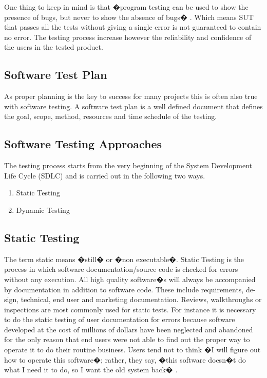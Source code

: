One thing to keep in mind is that �program testing can be used to show the presence of bugs, but never to show the absence of bugs� \cite{Dijkstra1972}. Which means SUT that passes all the tests without giving a single error is not guaranteed to contain no error. The testing process increase however the reliability and confidence of the users in the tested product.

\subsection{Software Test Plan}
As proper planning is the key to success for many projects this is often also true with software testing. A software test plan is a well defined document that defines the goal, scope, method, resources and time schedule of the testing.

\subsection{Software Testing Approaches}
The testing process starts from the very beginning of the System Development Life Cycle (SDLC) and is carried out in the following two ways.

\begin{enumerate}
\item Static Testing 
\item Dynamic Testing
\end{enumerate}

\subsection{Static Testing}

The term static means �still� or �non executable�. Static Testing is the process in which software documentation/source code is checked for errors without any execution. All high quality software�s will always be accompanied by documentation in addition to software code. These include requirements, de- sign, technical, end user and marketing documentation. Reviews, walkthroughs or inspections are most commonly used for static tests.
For instance it is necessary to do the static testing of user documentation for errors because software developed at the cost of millions of dollars have been neglected and abandoned for the only reason that end users were not able to find out the proper way to operate it to do their routine business. Users tend not to think �I will figure out how to operate this software�; rather, they say, �this software doesn�t do what I need it to do, so I want the old system back� \cite{Everett2007}.

